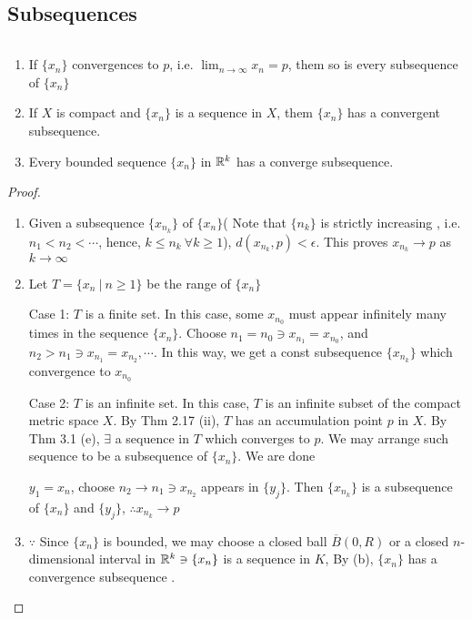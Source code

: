 \subsection{Subsequences}

\begin{thm} $ $
	\begin{enumerate}[wide, label = $(\alph*)$]
		\item If $\{x_n\}$ convergences to $p$, i.e. $\lim_{n \rightarrow \infty}x_n = p$, them so is every subsequence of $\{x_n\}$
		\item If $X$ is compact and $\{x_n\}$ is a sequence in $X$, them $\{x_n\}$ has a convergent subsequence.
		\item Every bounded sequence $\{x_n\}$ in $\mathbb{R}^k$ has a converge subsequence.
	\end{enumerate}
\end{thm}


\begin{proof}
	\begin{enumerate}[wide, label = $(\alph*)$]
		\item Given a subsequence $\{x_{n_k}\}$ of $\{x_n\}$( Note that $\{n_k\}$ is strictly increasing , i.e. $n_1 < n_2 < \cdots$, hence, $k \leq n_k ~ \forall k \geq 1$), $d(x_{n_k},p) < \epsilon$. This proves $x_{n_k} \rightarrow p$ as $k \rightarrow \infty$
		\item Let $T = \{x_n ~|~ n \geq 1\}$ be the range of $\{x_n\}$
		
		Case 1: $T$ is a finite set. In this case, some $x_{n_0}$ must appear infinitely many times in the sequence $\{x_n\}$. Choose $n_1 = n_0 \ni x_{n_1} = x_{n_0}$, and $n_2 > n_1 \ni x_{n_1} = x_{n_2},\cdots$. In this way, we get a const subsequence $\{x_{n_k}\}$ which convergence to $x_{n_0}$
		
		Case 2: $T$ is an infinite set. In this case, $T$ is an infinite subset of the compact metric space $X$. By Thm 2.17 (ii), $T$ has an accumulation point $p$ in $X$. By Thm 3.1 (e), $\exists$ a sequence in $T$ which converges to $p$. We may arrange such sequence to be a subsequence of $\{x_n\}$. We are done
		
		\begin{tcolorbox}
			$y_1 = x_n$, choose $n_2 \rightarrow n_1 \ni x_{n_2}$ appears in $\{y_j\}.$ Then $\{x_{n_k}\}$ is a subsequence of $\{x_n\}$ and $\{y_j\}$, $\therefore x_{n_k} \rightarrow p$
		\end{tcolorbox}
		\item $\because$ Since $\{x_n\}$ is bounded, we may choose a closed ball $\overline{B}(0,R)$ or a closed $n$-dimensional interval in $\mathbb{R}^k \ni \{x_n\}$ is a sequence in $K$, By (b), $\{x_n\}$ has a convergence subsequence .
	\end{enumerate}
\end{proof}



